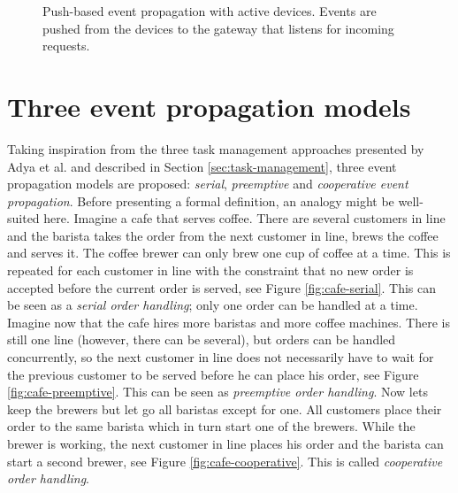 \begin{figure}[h!]
    \centering
    \caption[Push-based event propagation.]{Push-based event propagation with
    active devices. Events are pushed from the devices to the gateway that
    listens for incoming requests.}
    \label{fig:push-based}
\end{figure}

\section{Three event propagation models}

Taking inspiration from the three task management approaches presented by Adya
et al. \cite{adya2002cooperative} and described in Section
\ref{sec:task-management}, three event propagation models are proposed:
\textit{serial}, \textit{preemptive} and \textit{cooperative event
propagation}. Before presenting a formal definition, an analogy might be
well-suited here. Imagine a cafe that serves coffee. There are several
customers in line and the barista takes the order from the next customer in
line, brews the coffee and serves it. The coffee brewer can only brew one cup
of coffee at a time. This is repeated for each customer in line with the
constraint that no new order is accepted before the current order is served,
see Figure \ref{fig:cafe-serial}. This can be seen as a \textit{serial order
handling}; only one order can be handled at a time. Imagine now that the cafe
hires more baristas and more coffee machines. There is still one line (however,
there can be several), but orders can be handled concurrently, so the next
customer in line does not necessarily have to wait for the previous customer to
be served before he can place his order, see Figure \ref{fig:cafe-preemptive}.
This can be seen as \textit{preemptive order handling}. Now lets keep the
brewers but let go all baristas except for one.  All customers place their
order to the same barista which in turn start one of the brewers. While the
brewer is working, the next customer in line places his order and the barista
can start a second brewer, see Figure \ref{fig:cafe-cooperative}. This is
called \textit{cooperative order handling}.

